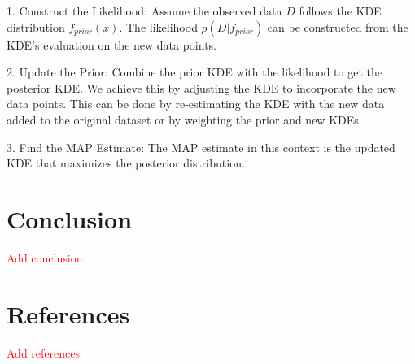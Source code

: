\documentclass[conference]{IEEEtran}
\begin{document}
1. Construct the Likelihood: Assume the observed data \( D \) follows the KDE distribution \( f_{prior}(x) \). The likelihood \( p(D | f_{prior}) \) can be constructed from the KDE's evaluation on the new data points.

2. Update the Prior: Combine the prior KDE with the likelihood to get the posterior KDE. We achieve this by adjusting the KDE to incorporate the new data points. This can be done by re-estimating the KDE with the new data added to the original dataset or by weighting the prior and new KDEs.

3. Find the MAP Estimate: The MAP estimate in this context is the updated KDE that maximizes the posterior distribution.

\section*{Conclusion}

\textcolor{red}{Add conclusion}

\section{References}
\textcolor{red}{Add references}
\end{document}
